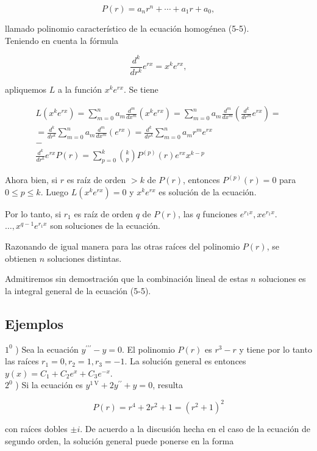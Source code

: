 \documentclass[10pt]{article}
\theoremstyle{plain}
\theoremstyle{definition}
\theoremstyle{remark}
\begin{document}
$$
P(r)=a_{n} r^{n}+\cdots+a_{1} r+a_{0},
$$

llamado polinomio característico de la ecuación homogénea (5-5).\\
Teniendo en cuenta la fórmula

$$
\frac{d^{k}}{d r^{k}} e^{r x}=x^{k} e^{r x},
$$

apliquemos $L$ a la función $x^{k} e^{r x}$. Se tiene

$$
\begin{gathered}
L\left(x^{k} e^{r x}\right)=\sum_{m=0}^{n} a_{m} \frac{d^{m}}{d x^{m}}\left(x^{k} e^{r x}\right)=\sum_{m=0}^{n} a_{m} \frac{d^{m}}{d x^{m}}\left(\frac{d^{k}}{d r^{m}} e^{r x}\right)= \\
=\frac{d^{k}}{d r^{k}} \sum_{m=0}^{n} a_{m} \frac{d^{m}}{d x^{m}}\left(e^{r x}\right)=\frac{d^{k}}{d r^{k}} \sum_{m=0}^{n} a_{m} r^{m} e^{r x} \\
- \\
\frac{d^{k}}{d r^{k}} e^{r x} P(r)=\sum_{p=0}^{k}\binom{k}{p} P^{(p)}(r) e^{r x} x^{k-p}
\end{gathered}
$$

Ahora bien, si $r$ es raíz de orden $>k$ de $P(r)$, entonces $P^{(p)}(r)=0$ para $0 \leqslant p \leqslant k$. Luego $L\left(x^{k} e^{r x}\right)=0$ y $x^{k} e^{r x}$ es solución de la ecuación.

Por lo tanto, si $r_{1}$ es raíz de orden $q$ de $P(r)$, las $q$ funciones $e^{r_{1} x}, x e^{r_{1} x}$. $\ldots, x^{q-1} e^{r_{1} x}$ son soluciones de la ecuación.

Razonando de igual manera para las otras raíces del polinomio $P(r)$, se obtienen $n$ soluciones distintas.

Admitiremos sin demostración que la combinación lineal de estas $n$ soluciones es la integral general de la ecuación (5-5).

\subsection{Ejemplos}
$1^{0}$ ) Sea la ecuación $y^{\prime \prime \prime}-y=0$. El polinomio $P(r)$ es $r^{3}-r$ y tiene por lo tanto las raíces $r_{1}=0, r_{2}=1, r_{3}=-1$. La solución general es entonces $y(x)=C_{1}+C_{2} e^{x}+C_{3} e^{-x}$.\\
$2^{0}$ ) Si la ecuación es $y^{1 \mathrm{~V}}+2 y^{\prime \prime}+y=0$, resulta

$$
P(r)=r^{4}+2 r^{2}+1=\left(r^{2}+1\right)^{2}
$$

con raíces dobles $\pm i$. De acuerdo a la discusión hecha en el caso de la ecuación de segundo orden, la solución general puede ponerse en la forma
\end{document}
